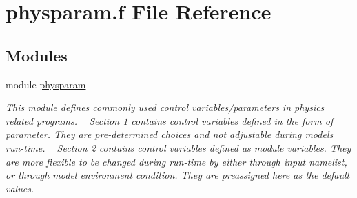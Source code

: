 \hypertarget{physparam_8f}{}\section{physparam.\+f File Reference}
\label{physparam_8f}
\subsection*{Modules}
\begin{DoxyCompactItemize}
\item 
module \hyperlink{namespacephysparam}{physparam}
\begin{DoxyCompactList}\small\item\em This module defines commonly used control variables/parameters in physics related programs. ~\newline
 Section 1 contains control variables defined in the form of parameter. They are pre-\/determined choices and not adjustable during model\textquotesingle{}s run-\/time. ~\newline
 Section 2 contains control variables defined as module variables. They are more flexible to be changed during run-\/time by either through input namelist, or through model environment condition. They are preassigned here as the default values. \end{DoxyCompactList}\end{DoxyCompactItemize}
